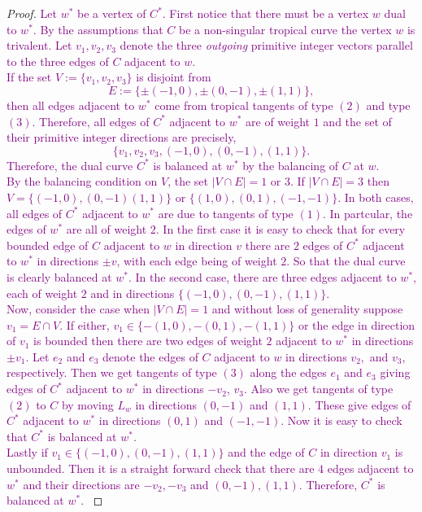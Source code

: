 \documentclass[oneside]{amsart}
\theoremstyle{definition}
\newcommand{\kristin}[1]{\textcolor{purple}{#1}}
\begin{document}
\begin{proof}
\kristin{	
Let $w^*$ be a vertex of $C^*$. First notice that there must be a vertex $w$ dual to 
$w^*$. By the assumptions that $C$ be a non-singular tropical curve the vertex $w$ is 
trivalent. Let $v_1, v_2, v_3$ denote the three \emph{outgoing} primitive integer 
vectors parallel to the three edges of $C$ adjacent to $w$.\\ 
%
If the set  $V:= \{v_1, v_2, v_3\}$ is disjoint from  $$E:= \{\pm(-1, 0),
\pm(0, -1), \pm(1, 1)\}, $$ then all edges adjacent to $w^*$ come from tropical
tangents of type $(2)$ and type $(3)$.
Therefore, all edges of $C^*$ adjacent to $w^*$ are of weight $1$ and the set of their 
primitive integer directions are precisely, 
$$\{v_1, v_2, v_3, (-1, 0), (0, -1), (1, 1)\}.$$
Therefore, the dual curve $C^*$ is balanced at $w^*$ by the balancing of $C$ at $w$.\\  
%
By the balancing condition on $V$, the set $|V \cap E| = 1$ or $3$.  If $|V \cap E| =
3$ then $V = \{(-1, 0), (0,-1) (1, 1)\} $ or $\{(1, 0), (0, 1) ,(-1, -1)\}$. In
both cases, all edges of $C^*$ adjacent to $w^*$ are due to tangents of  type
$(1)$. In partcular, the edges of $w^*$ are all of weight $2$. In the first case it is easy to check that for every bounded edge of $C$ adjacent to $w$ in direction $v$ there are
$2$ edges of $C^*$ adjacent to $w^*$ in directions $\pm v$, with each edge
being of weight $2$. So that the dual curve is clearly balanced at $w^*$. In
the second case, there are three  edges adjacent to $w^*$, each of weight $2$
and in directions $\{(-1, 0), (0, -1), (1, 1)\}.$ \\
%
Now, consider the case when $|V \cap E| = 1$ and without loss of generality
suppose $v_1 = E \cap V$. If either, $v_1 \in \{- (1, 0), -(0, 1), -(1, 1)\}$ or
the edge in direction of $v_1$ is bounded then there are two edges of  weight $2$ 
adjacent to $w^*$ in directions $\pm v_1$. Let $e_2$ and $e_3$ denote the edges of $C$
adjacent to $w$ in directions 
$v_2,$ and $ v_3$, respectively. Then we get tangents of type $(3)$ along the edges $e_1$
and $e_3$ giving edges of $C^*$ adjacent to $w^*$ in directions $-v_2$, $v_3$. Also we get
tangents of type $(2)$ to $C$ by moving $L_w$ in directions $(0, -1)$ and $(1, 1)$. These give edges of $C^*$ adjacent to $w^*$ in directions $(0, 1)$ and $(-1, -1) $. 
Now it is easy to check that $C^*$ is balanced at $w^*$.\\
%
Lastly if  $v_1 \in \{ (-1, 0), (0, -1), (1, 1)  \}$ and the 
edge of $C$ in direction $v_1$ is unbounded. Then it is a straight forward check that 
there are $4$ edges adjacent to $w^*$ and their directions are $-v_2, -v_3$ and $(0, -1), (1, 1)$. Therefore, $C^*$ is balanced at $w^*$.   
}
\end{proof}
\end{document}
